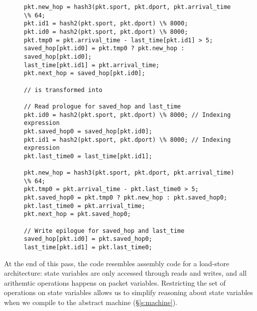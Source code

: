 \begin{figure}
\begin{small}
\begin{lstlisting}
pkt.new_hop = hash3(pkt.sport, pkt.dport, pkt.arrival_time \% 64;
pkt.id1 = hash2(pkt.sport, pkt.dport) \% 8000;
pkt.id0 = hash2(pkt.sport, pkt.dport) \% 8000;
pkt.tmp0 = pkt.arrival_time - last_time[pkt.id1] > 5;
saved_hop[pkt.id0] = pkt.tmp0 ? pkt.new_hop : saved_hop[pkt.id0];
last_time[pkt.id1] = pkt.arrival_time;
pkt.next_hop = saved_hop[pkt.id0];

// is transformed into

// Read prologue for saved_hop and last_time
pkt.id0 = hash2(pkt.sport, pkt.dport) \% 8000; // Indexing expression
pkt.saved_hop0 = saved_hop[pkt.id0];
pkt.id1 = hash2(pkt.sport, pkt.dport) \% 8000; // Indexing expression
pkt.last_time0 = last_time[pkt.id1];

pkt.new_hop = hash3(pkt.sport, pkt.dport, pkt.arrival_time) \% 64;
pkt.tmp0 = pkt.arrival_time - pkt.last_time0 > 5;
pkt.saved_hop0 = pkt.tmp0 ? pkt.new_hop : pkt.saved_hop0;
pkt.last_time0 = pkt.arrival_time;
pkt.next_hop = pkt.saved_hop0;

// Write epilogue for saved_hop and last_time
saved_hop[pkt.id0] = pkt.saved_hop0;
last_time[pkt.id1] = pkt.last_time0;
\end{lstlisting}
\end{small}
\end{figure}

At the end of this pass, the code resembles assembly code for a load-store
architecture: state variables are only accessed through reads and writes, and
all arithemtic operations happens on packet variables. Restricting the set of
operations on state variables allows us to simplify reasoning about state
variables when we compile \pktlanguage to the abstract machine
(\S\ref{s:machine}).

